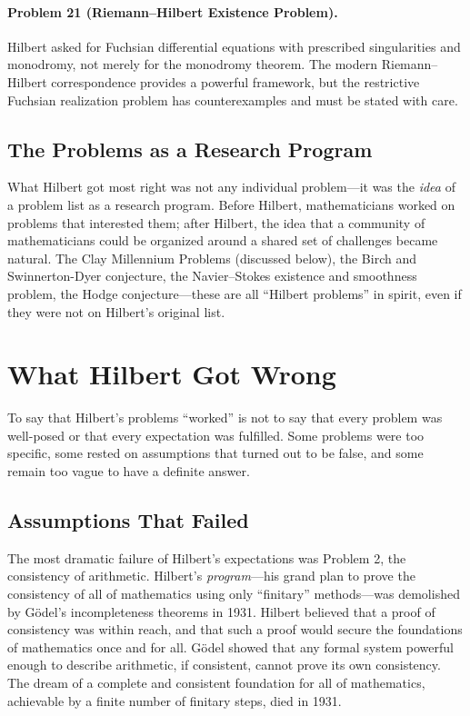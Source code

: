\paragraph{Problem 21 (Riemann--Hilbert Existence Problem).} Hilbert asked for Fuchsian differential equations with prescribed singularities and monodromy, not merely for the monodromy theorem. The modern Riemann--Hilbert correspondence provides a powerful framework, but the restrictive Fuchsian realization problem has counterexamples and must be stated with care.

\subsection{The Problems as a Research Program}

What Hilbert got most right was not any individual problem---it was the \emph{idea} of a problem list as a research program. Before Hilbert, mathematicians worked on problems that interested them; after Hilbert, the idea that a community of mathematicians could be organized around a shared set of challenges became natural. The Clay Millennium Problems (discussed below), the Birch and Swinnerton-Dyer conjecture, the Navier--Stokes existence and smoothness problem, the Hodge conjecture---these are all ``Hilbert problems'' in spirit, even if they were not on Hilbert's original list.

\section{What Hilbert Got Wrong}

To say that Hilbert's problems ``worked'' is not to say that every problem was well-posed or that every expectation was fulfilled. Some problems were too specific, some rested on assumptions that turned out to be false, and some remain too vague to have a definite answer.

\subsection{Assumptions That Failed}

The most dramatic failure of Hilbert's expectations was Problem 2, the consistency of arithmetic. Hilbert's \emph{program}---his grand plan to prove the consistency of all of mathematics using only ``finitary'' methods---was demolished by G\"odel's incompleteness theorems in 1931. Hilbert believed that a proof of consistency was within reach, and that such a proof would secure the foundations of mathematics once and for all. G\"odel showed that any formal system powerful enough to describe arithmetic, if consistent, cannot prove its own consistency. The dream of a complete and consistent foundation for all of mathematics, achievable by a finite number of finitary steps, died in 1931.

